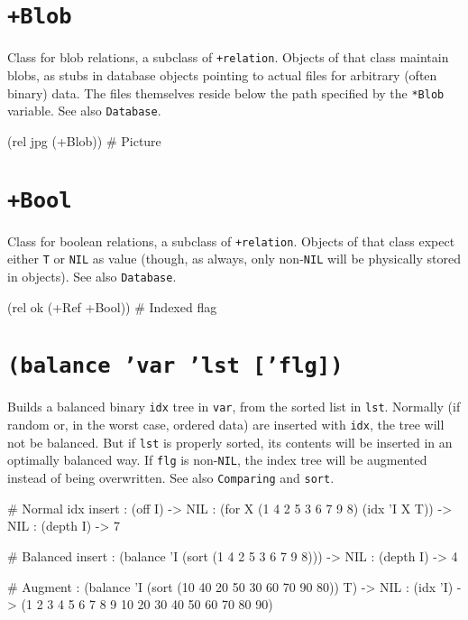  
\section*{\texttt{+Blob}}
\label{sec:funct-ref-B-+blob}


Class for blob relations, a subclass of \texttt{+relation}. Objects of that
class maintain blobs, as stubs in database objects pointing to actual
files for arbitrary (often binary) data. The files themselves reside
below the path specified by the \texttt{*Blob} variable. See also \texttt{Database}.


\begin{wideverbatim}
(rel jpg (+Blob))  # Picture
\end{wideverbatim}


\section*{\texttt{+Bool}}
\label{sec:funct-ref-B-+bool}

Class for boolean relations, a subclass of \texttt{+relation}. Objects of that
class expect either \texttt{T} or \texttt{NIL} as value (though, as always, only
non-\texttt{NIL} will be physically stored in objects). See also \texttt{Database}.


\begin{wideverbatim}
(rel ok (+Ref +Bool))  # Indexed flag
\end{wideverbatim}

 
\section*{\texttt{(balance 'var 'lst ['flg])}}
\label{sec:funct-ref-B-(balance-'var-'lst-['flg])}


Builds a balanced binary \texttt{idx} tree in \texttt{var}, from the sorted list in
\texttt{lst}. Normally (if random or, in the worst case, ordered data) are
inserted with \texttt{idx}, the tree will not be balanced. But if \texttt{lst} is
properly sorted, its contents will be inserted in an optimally balanced
way. If \texttt{flg} is non-\texttt{NIL}, the index tree will be augmented instead of
being overwritten. See also \texttt{Comparing} and \texttt{sort}.


\begin{wideverbatim}
# Normal idx insert
: (off I)
-> NIL
: (for X (1 4 2 5 3 6 7 9 8) (idx 'I X T))
-> NIL
: (depth I)
-> 7

# Balanced insert
: (balance 'I (sort (1 4 2 5 3 6 7 9 8)))
-> NIL
: (depth I)
-> 4

# Augment
: (balance 'I (sort (10 40 20 50 30 60 70 90 80)) T)
-> NIL
: (idx 'I)
-> (1 2 3 4 5 6 7 8 9 10 20 30 40 50 60 70 80 90)
\end{wideverbatim}

